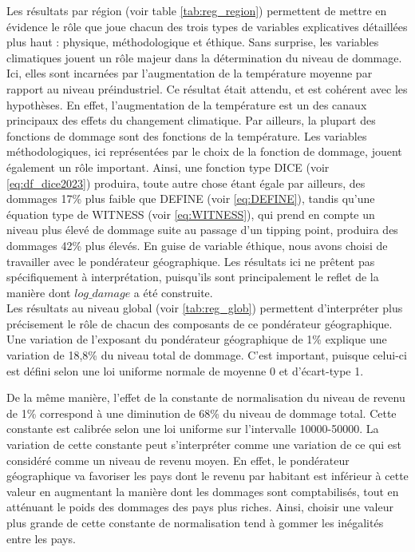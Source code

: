 Les résultats par région (voir table \ref{tab:reg_region}) permettent de mettre en évidence le rôle que joue chacun des trois types de variables explicatives détaillées plus haut : physique, méthodologique et éthique. 
Sans surprise, les variables climatiques jouent un rôle majeur dans la détermination du niveau de dommage. Ici, elles sont incarnées par l'augmentation de la température moyenne par rapport au niveau préindustriel. Ce résultat était attendu, et est cohérent avec les hypothèses. En effet, l'augmentation de la température est un des canaux principaux des effets du changement climatique. Par ailleurs, la plupart des fonctions de dommage sont des fonctions de la température. 
Les variables méthodologiques, ici représentées par le choix de la fonction de dommage, jouent également un rôle important. Ainsi, une fonction type DICE (voir \ref{eq:df_dice2023}) produira, toute autre chose étant égale par ailleurs, des dommages 17\% plus faible que DEFINE (voir \ref{eq:DEFINE}), tandis qu'une équation type de WITNESS (voir \ref{eq:WITNESS}), qui prend en compte un niveau plus élevé de dommage suite au passage d'un tipping point, produira des dommages 42\% plus élevés. 
En guise de variable éthique, nous avons choisi de travailler avec le pondérateur géographique. Les résultats ici ne prêtent pas spécifiquement à interprétation, puisqu'ils sont principalement le reflet de la manière dont $log\_damage$ a été construite. \\

Les résultats au niveau global (voir \ref{tab:reg_glob}) permettent d'interpréter plus précisement le rôle de chacun des composants de ce pondérateur géographique. Une variation de l'exposant du pondérateur géographique de 1\% explique une variation de 18,8\% du niveau total de dommage. C'est important, puisque celui-ci est défini selon une loi uniforme normale de moyenne 0 et d'écart-type 1.

De la même manière, l'effet de la constante de normalisation du niveau de revenu de 1\% correspond à une diminution de 68\% du niveau de dommage
total. Cette constante est calibrée selon une loi uniforme sur l'intervalle 10000-50000. La variation de cette constante peut s'interpréter comme une variation de ce qui est considéré comme un niveau de revenu moyen. En effet, le pondérateur géographique va favoriser les pays dont le revenu par habitant est inférieur à cette valeur en augmentant la manière dont les dommages sont comptabilisés, tout en atténuant le poids des dommages des pays plus riches. Ainsi, choisir une valeur plus grande de cette constante de normalisation tend à gommer les inégalités entre les pays. 

